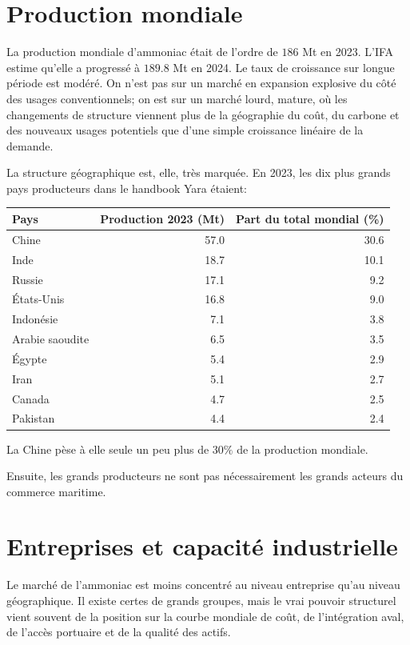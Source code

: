 \documentclass[11pt]{article}
\begin{document}
\section{Production mondiale}

La production mondiale d'ammoniac était de l'ordre de \(186\) Mt en 2023. L'IFA estime qu'elle a progressé à \(189.8\) Mt en 2024. Le taux de croissance sur longue période est modéré. On n'est pas sur un marché en expansion explosive du côté des usages conventionnels; on est sur un marché lourd, mature, où les changements de structure viennent plus de la géographie du coût, du carbone et des nouveaux usages potentiels que d'une simple croissance linéaire de la demande.

La structure géographique est, elle, très marquée. En 2023, les dix plus grands pays producteurs dans le handbook Yara étaient:

\begin{center}
\begin{tabular}{lrr}
\toprule
Pays & Production 2023 (Mt) & Part du total mondial (\%) \\
\midrule
Chine & 57.0 & 30.6 \\
Inde & 18.7 & 10.1 \\
Russie & 17.1 & 9.2 \\
États-Unis & 16.8 & 9.0 \\
Indonésie & 7.1 & 3.8 \\
Arabie saoudite & 6.5 & 3.5 \\
Égypte & 5.4 & 2.9 \\
Iran & 5.1 & 2.7 \\
Canada & 4.7 & 2.5 \\
Pakistan & 4.4 & 2.4 \\
\bottomrule
\end{tabular}
\end{center}


La Chine pèse à elle seule un peu plus de \(30\%\) de la production mondiale. 

Ensuite, les grands producteurs ne sont pas nécessairement les grands acteurs du commerce maritime.

\section{Entreprises et capacité industrielle}

Le marché de l'ammoniac est moins concentré au niveau entreprise qu'au niveau géographique. Il existe certes de grands groupes, mais le vrai pouvoir structurel vient souvent de la position sur la courbe mondiale de coût, de l'intégration aval, de l'accès portuaire et de la qualité des actifs.
\end{document}
